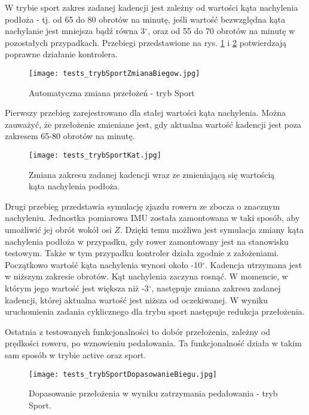 W trybie sport zakres zadanej kadencji jest zależny od wartości kąta nachylenia podłoża - tj. od 65 do 80 obrotów na minutę, jeśli wartość bezwzględna kąta nachylanie jest mniejsza bądź równa 3$^{\circ}$, oraz od 55 do 70 obrotów na minutę w pozostałych przypadkach. Przebiegi przedstawione na rys.  \ref{fig:tests_sportModeZmiana1} i \ref{fig:tests_sportModeZmiana2} potwierdzają poprawne działanie kontrolera.
\begin{figure}[h]
    \centering
    \texttt{[image: tests\_trybSportZmianaBiegow.jpg]}
    \caption{Automatyczna zmiana przełożeń - tryb Sport}
    \label{fig:tests_sportModeZmiana1}
\end{figure}
Pierwszy przebieg zarejestrowano dla stałej wartości kąta nachylenia. Można zauważyć, że przełożenie zmieniane jest, gdy aktualna wartość kadencji jest poza zakresem 65-80 obrotów na minutę. 
\begin{figure}[h]
    \centering
    \texttt{[image: tests\_trybSportKat.jpg]}
    \caption{Zmiana zakresu zadanej kadencji wraz ze zmieniającą się wartością kąta nachylenia podłoża.}
    \label{fig:tests_sportModeZmiana2}
\end{figure}

Drugi przebieg przedstawia symulację zjazdu roweru ze zbocza o znacznym nachyleniu. Jednostka pomiarowa IMU została zamontowana w taki sposób, aby umożliwić jej obrót wokół osi $Z$. Dzięki temu możliwa jest symulacja zmiany kąta nachylenia podłoża w przypadku, gdy rower zamontowany jest na stanowisku testowym. Także w tym przypadku kontroler działa zgodnie z założeniami. Początkowo wartość kąta nachylenia wynosi około -10$^{\circ}$. Kadencja utrzymana jest w niższym zakresie obrotów. Kąt nachylenia zaczyna rosnąć. W momencie, w którym jego wartość jest większa niż -3$^{\circ}$, następuje zmiana zakresu zadanej kadencji, której aktualna wartość jest niższa od oczekiwanej. W wyniku uruchomienia zadania cyklicznego dla trybu sport następuje redukcja przełożenia.

Ostatnia z testowanych funkcjonalności to dobór przełożenia, zależny od prędkości roweru, po wznowieniu pedałowania. Ta funkcjonalność działa w takim sam sposób w trybie active oraz sport.
\begin{figure}[h]
    \centering
    \texttt{[image: tests\_trybSportDopasowanieBiegu.jpg]}
    \caption{Dopasowanie przełożenia w wyniku zatrzymania pedałowania - tryb Sport.}
    \label{fig:tests_gearSpeedSelection}
\end{figure}

